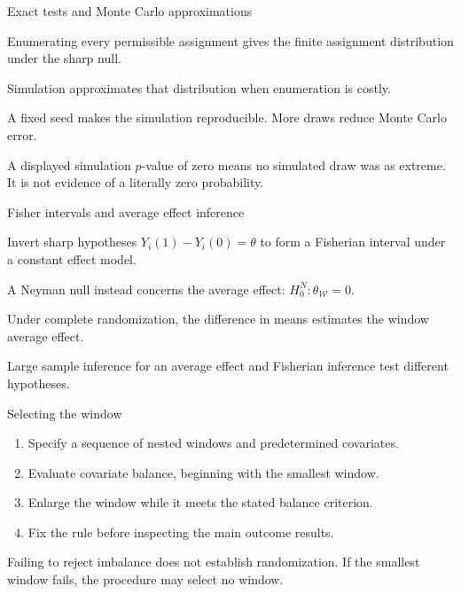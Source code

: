\begin{frame}{Exact tests and Monte Carlo approximations}
\begin{items}
\item Enumerating every permissible assignment gives the finite assignment distribution under the sharp null.
\item Simulation approximates that distribution when enumeration is costly.
\item A fixed seed makes the simulation reproducible. More draws reduce Monte Carlo error.
\item A displayed simulation $p$-value of zero means no simulated draw was as extreme. It is not evidence of a literally zero probability.
\end{items}
\end{frame}

\begin{frame}{Fisher intervals and average effect inference}
\begin{items}
\item Invert sharp hypotheses $Y_i(1)-Y_i(0)=\theta$ to form a Fisherian interval under a constant effect model.
\item A Neyman null instead concerns the average effect: $H_0^N:\theta_{\mathcal W}=0$.
\item Under complete randomization, the difference in means estimates the window average effect.
\item Large sample inference for an average effect and Fisherian inference test different hypotheses.
\end{items}
\end{frame}

\begin{frame}{Selecting the window}
\begin{enumerate}\setlength{\itemsep}{.55em}
\item Specify a sequence of nested windows and predetermined covariates.
\item Evaluate covariate balance, beginning with the smallest window.
\item Enlarge the window while it meets the stated balance criterion.
\item Fix the rule before inspecting the main outcome results.
\end{enumerate}
\vspace{.6em}
Failing to reject imbalance does not establish randomization. If the smallest window fails, the procedure may select no window.
\end{frame}

